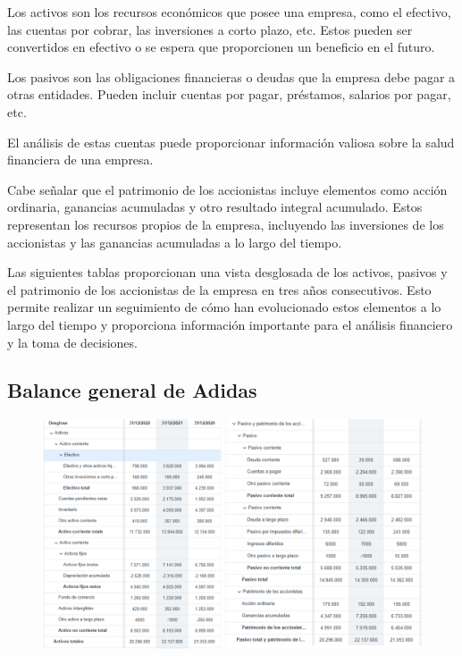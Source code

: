 \documentclass[a4paper,12pt]{article}
\begin{document}
Los activos son los recursos económicos que posee una empresa, como el efectivo, las cuentas por cobrar, las inversiones a corto plazo, etc. Estos pueden ser convertidos en efectivo o se espera que proporcionen un beneficio en el futuro.

Los pasivos son las obligaciones financieras o deudas que la empresa debe pagar a otras entidades. Pueden incluir cuentas por pagar, préstamos, salarios por pagar, etc.

El análisis de estas cuentas puede proporcionar información valiosa sobre la salud financiera de una empresa.

Cabe señalar que el patrimonio de los accionistas incluye elementos como acción ordinaria, ganancias acumuladas y otro resultado integral acumulado. Estos representan los recursos propios de la empresa, incluyendo las inversiones de los accionistas y las ganancias acumuladas a lo largo del tiempo.

Las siguientes tablas proporcionan una vista desglosada de los activos, pasivos y el patrimonio de los accionistas de la empresa en tres años consecutivos. Esto permite realizar un seguimiento de cómo han evolucionado estos elementos a lo largo del tiempo y proporciona información importante para el análisis financiero y la toma de decisiones.


\subsection{Balance general de Adidas}

\begin{figure}[ht!]
	\centering

	\includegraphics[width=.9\textwidth]{AdidasB}
\end{figure}
\end{document}
